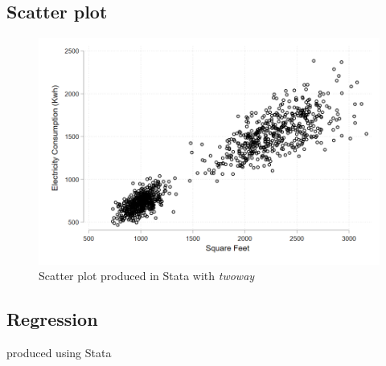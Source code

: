 \documentclass{article}
\begin{document}
\subsection{Scatter plot}

\begin{figure}[ht]
    \centering
    \includegraphics[scale = 0.4]{scatter_stata.png}
    \caption{Scatter plot produced in Stata with \textit{twoway}}
\end{figure}
\vspace{5cm}

\subsection{Regression}

\begin{table}[ht]
    \centering
    
    \caption{produced using Stata}
    \label{tab:statasummary}
\end{table}
\end{document}

